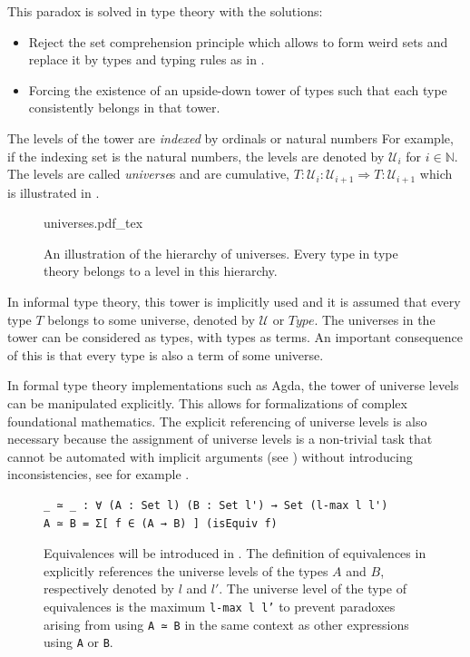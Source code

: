 \documentclass[12pt,a4paper,twoside,xetex]{book} %
\newcommand{\keyword}[1]{\emph{#1}\index{#1}}
\newcommand{\incfig}[1]{%
    \def\svgwidth{0.6\columnwidth}
    {#1.pdf_tex}
}
\begin{document}
This paradox is solved in type theory with the solutions:

\begin{itemize}
 \item Reject the set comprehension principle which allows to form weird sets and replace it by types and typing rules as in .
 \item  Forcing the existence of an upside-down tower of types such that each type consistently belongs in that tower. 
 
\end{itemize}
 
The levels of the 
tower are \keyword{indexed} by ordinals or natural numbers For example, if the indexing set is the natural numbers, the levels are denoted by $\mathcal{U}_i$ for $i\in \mathbb{N}$. The levels are called \keyword{universe}s and are cumulative, $T: 
\mathcal{U}_i:\mathcal{U}_{i+1} \Rightarrow T : \mathcal{U}_{i+1}$ which is illustrated in .

\begin{figure}\label{universefig}
\centering
\incfig{universes}
\caption{An illustration of the hierarchy of universes. Every type in type theory belongs to a level in this hierarchy.}
\end{figure}



In informal type theory, this tower is implicitly used and it is assumed that 
every type $T$ belongs to some universe, denoted by $\mathcal{U}$ or $Type$. The 
universes in the tower can be considered as types, with types as terms. An 
important consequence of this is that every type is also a term of some 
universe.

In formal type theory implementations such as Agda, the tower of universe levels 
can be manipulated explicitly. This allows for formalizations of 
complex foundational mathematics. The explicit referencing of universe levels is also necessary because the 
assignment of universe levels is a non-trivial task that cannot be automated with implicit arguments (see )
without introducing inconsistencies, see for example .

\begin{figure}\label{AgdaEquivalences}
\centering
\begin{BVerbatim}
_ ≃ _ : ∀ (A : Set l) (B : Set l') → Set (l-max l l')
A ≃ B = Σ[ f ∈ (A → B) ] (isEquiv f)
\end{BVerbatim}

\caption{Equivalences will be introduced in . The definition 
of equivalences in \cite{Moertberg2018} explicitly references the 
universe levels of the types $A$ and $B$, respectively denoted by $l$ and $l'$. 
The universe level of the type of equivalences is the maximum \texttt{l-max l l'} 
to prevent paradoxes arising from using \texttt{A ≃ B} in the same context as 
other expressions using \texttt{A} or \texttt{B}.}
\end{figure}
\end{document}
